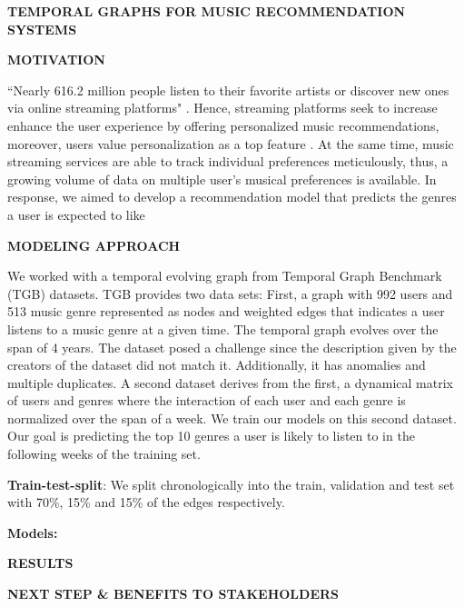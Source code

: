 \documentclass[10pt, letterpaper]{article}
\renewcommand{\title}[1]{%
	\begin{center}
		{\Large \bfseries \uppercase{#1}}
	\end{center}
}
\renewcommand{\section}[1]{%
	    \vspace{\parskip}
		{\large \bfseries\uppercase{#1}}
}
\begin{document}
	
\title{Temporal Graphs for Music Recommendation Systems}

\section{Motivation}

``Nearly 616.2 million people listen to their favorite artists or discover new ones via online streaming platforms" \cite{statista}. Hence, streaming platforms seek to increase enhance the user experience by offering personalized music recommendations, moreover, users value personalization as a top feature \cite{spotify}. At the same time, music streaming services are able to track individual preferences meticulously, thus, a growing volume of data on  multiple user's musical preferences is available.
In response, we aimed to develop a recommendation model that predicts the genres a user is expected to like

\section{Modeling approach}

We worked with a temporal evolving graph from Temporal Graph Benchmark (TGB) \cite{H:2023} datasets. TGB provides two data sets: First, a graph with 992 users and 513 music genre represented as nodes and weighted edges that indicates a user listens to a music genre at a given time. The temporal graph evolves over the span of 4 years.  The dataset posed a challenge since the description given by the creators of the dataset did not match it. Additionally, it has anomalies and multiple duplicates. A second dataset derives from the first, a dynamical matrix of users and genres where the interaction of each user and each genre is normalized over the span of a week. We train our models on this second dataset. Our goal is predicting the top 10 genres a user is likely to listen to in the following weeks of the training set.
 
\textbf{Train-test-split}: We split chronologically into the train, validation and test set with 70\%, 15\% and 15\% of the edges respectively. 

\textbf{Models:}

\section{Results}


\section{Next step \& benefits to stakeholders}
\end{document}
